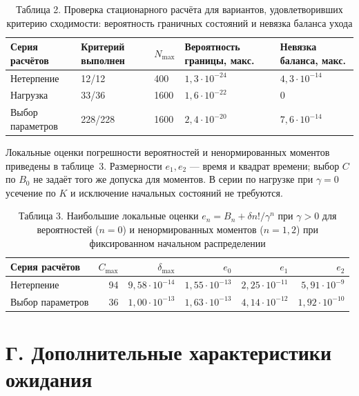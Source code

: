 \begin{table}[htbp]\centering\small
\caption{Таблица 2. Проверка стационарного расчёта для вариантов, удовлетворивших критерию сходимости: вероятность граничных состояний и невязка баланса ухода}
\begin{tabular}{p{.20\linewidth}p{.14\linewidth}p{.10\linewidth}p{.19\linewidth}p{.23\linewidth}}
\hline
Серия расчётов & Критерий выполнен & $N_{\max}$ & Вероятность границы, макс. & Невязка баланса, макс. \\
\hline
Нетерпение & 12/12 & 400 & $1{,}3\cdot10^{-24}$ & $4{,}3\cdot10^{-14}$ \\
Нагрузка & 33/36 & 1600 & $1{,}6\cdot10^{-22}$ & $0$ \\
Выбор параметров & 228/228 & 1600 & $2{,}4\cdot10^{-20}$ & $7{,}6\cdot10^{-14}$ \\
\hline
\end{tabular}

\end{table}

Локальные оценки погрешности вероятностей и ненормированных моментов приведены в таблице~3. Размерности $e_1,e_2$ --- время и квадрат времени; выбор $C$ по $B_0$ не задаёт того же допуска для моментов. В серии по нагрузке при $\gamma=0$ усечение по $K$ и исключение начальных состояний не требуются.

\begin{table}[htbp]\centering\small
\caption{Таблица 3. Наибольшие локальные оценки $e_n=B_n+\delta n!/\gamma^n$ при $\gamma>0$ для вероятностей ($n=0$) и ненормированных моментов ($n=1,2$) при фиксированном начальном распределении}
\begin{tabular}{lrrrrr}
\hline
Серия расчётов & $C_{\max}$ & $\delta_{\max}$ & $e_0$ & $e_1$ & $e_2$ \\
\hline
Нетерпение & 94 & $9{,}58\cdot10^{-14}$ & $1{,}55\cdot10^{-13}$ & $2{,}25\cdot10^{-11}$ & $5{,}91\cdot10^{-9}$ \\
Выбор параметров & 36 & $1{,}00\cdot10^{-13}$ & $1{,}63\cdot10^{-13}$ & $4{,}14\cdot10^{-12}$ & $1{,}92\cdot10^{-10}$ \\
\hline
\end{tabular}

\end{table}

\section*{Г. Дополнительные характеристики ожидания}

